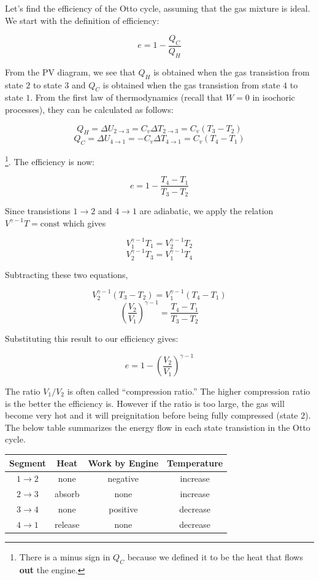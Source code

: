 Let's find the efficiency of the Otto cycle, assuming that the gas mixture is ideal. We start with the definition of efficiency:

\[e=1-\frac{Q_C}{Q_H}\]

From the PV diagram, we see that $Q_H$ is obtained when the gas transistion from state $2$ to state $3$ and $Q_C$ is obtained when the gas transistion from state $4$ to state $1$. From the first law of thermodynamics (recall that $W=0$ in isochoric processes), they can be calculated as follows:

\[Q_H=\Delta U_{2\to3}=C_v\Delta T_{2\to3}=C_v (T_3-T_2)\]
\[Q_C=\Delta U_{4\to1}=-C_v\Delta T_{4\to1}=C_v(T_4-T_1)\]

\footnote{There is a minus sign in $Q_C$ because we defined it to be the heat that flows \textbf{out} the engine.}. The efficiency is now:

\[e=1-\frac{T_4-T_1}{T_3-T_2}\]

Since transistions $1\to2$ and $4\to1$ are adiabatic, we apply the relation $V^{\gamma-1}T=\text{const}$ which gives

\[V_1^{\gamma-1}T_1=V_2^{\gamma-1}T_2\]
\[V_2^{\gamma-1}T_3=V_1^{\gamma-1}T_4\]

Subtracting these two equations,

\[V_2^{\gamma-1}(T_3-T_2)=V_1^{\gamma-1}(T_4-T_1)\]
\[\left( \frac{V_2}{V_1} \right)^{\gamma-1}=\frac{T_4-T_1}{T_3-T_2}\]

Substituting this result to our efficiency gives:

\[\boxed{e=1-\left( \frac{V_2}{V_1} \right)^{\gamma-1}}\]

The ratio $V_1/V_2$ is often called ``compression ratio.'' The higher compression ratio is the better the efficiency is. However if the ratio is too large, the gas will become very hot and it will preignitation before being fully compressed (state $2$). \\

The below table summarizes the energy flow in each state transistion in the Otto cycle.

\begin{center}
	\begin{tabular}{c|c|c|c}
		Segment & Heat & Work \textbf{by} Engine & Temperature \\
		\hline
		$1\to2$ & none & negative & increase \\
		\hline
		$2\to3$ & absorb & none & increase \\
		\hline
		$3\to4$ & none & positive & decrease \\
		\hline
		$4\to1$ & release & none & decrease
	\end{tabular}
\end{center}

